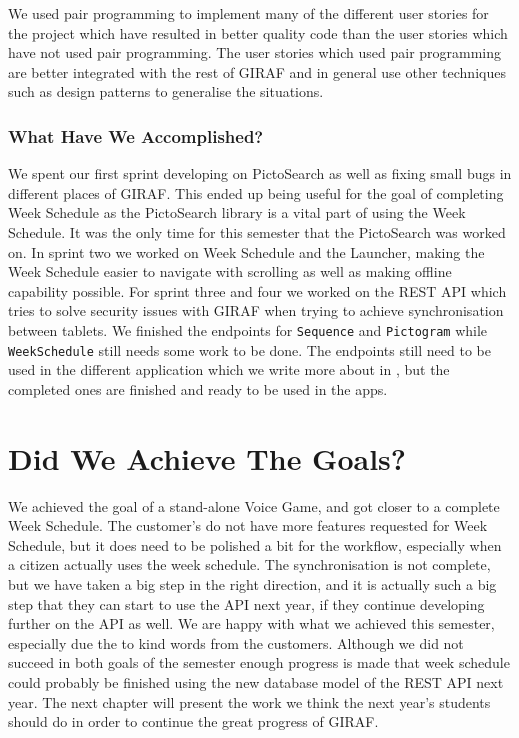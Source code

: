 We used pair programming to implement many of the different user stories for the project which have resulted in better quality code than the user stories which have not used pair programming.
The user stories which used pair programming are better integrated with the rest of GIRAF and in general use other techniques such as design patterns to generalise the situations.

\subsubsection*{What Have We Accomplished?}
We spent our first sprint developing on PictoSearch as well as fixing small bugs in different places of GIRAF.
This ended up being useful for the goal of completing Week Schedule as the PictoSearch library is a vital part of using the Week Schedule.
It was the only time for this semester that the PictoSearch was worked on.
In sprint two we worked on Week Schedule and the Launcher, making the Week Schedule easier to navigate with scrolling as well as making offline capability possible.
For sprint three and four we worked on the REST API which tries to solve security issues with GIRAF when trying to achieve synchronisation between tablets.
We finished the endpoints for \texttt{Sequence} and \texttt{Pictogram} while \texttt{WeekSchedule} still needs some work to be done.
The endpoints still need to be used in the different application which we write more about in , but the completed ones are finished and ready to be used in the apps.

\section{Did We Achieve The Goals?}
We achieved the goal of a stand-alone Voice Game, and got closer to a complete Week Schedule.
The customer's do not have more features requested for Week Schedule, but it does need to be polished a bit for the workflow, especially when a citizen actually uses the week schedule.
The synchronisation is not complete, but we have taken a big step in the right direction, and it is actually such a big step that they can start to use the API next year, if they continue developing further on the API as well.
We are happy with what we achieved this semester, especially due the to kind words from the customers.
Although we did not succeed in both goals of the semester enough progress is made that week schedule could probably be finished using the new database model of the REST API next year.
The next chapter will present the work we think the next year's students should do in order to continue the great progress of GIRAF.


